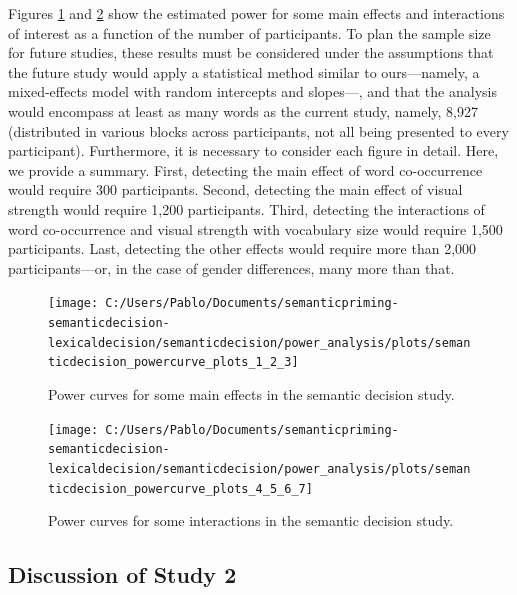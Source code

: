 \documentclass[
  12pt,
  man,floatsintext]{apa7}
\begin{document}
Figures \ref{fig:semanticdecision-powercurve-plots-1-2-3} and \ref{fig:semanticdecision-powercurve-plots-4-5-6-7} show the estimated power for some main effects and interactions of interest as a function of the number of participants. To plan the sample size for future studies, these results must be considered under the assumptions that the future study would apply a statistical method similar to ours---namely, a mixed-effects model with random intercepts and slopes---, and that the analysis would encompass at least as many words as the current study, namely, 8,927 (distributed in various blocks across participants, not all being presented to every participant). Furthermore, it is necessary to consider each figure in detail. Here, we provide a summary. First, detecting the main effect of word co-occurrence would require 300 participants. Second, detecting the main effect of visual strength would require 1,200 participants. Third, detecting the interactions of word co-occurrence and visual strength with vocabulary size would require 1,500 participants. Last, detecting the other effects would require more than 2,000 participants---or, in the case of gender differences, many more than that.

\begin{figure}

{\centering \texttt{[image: C:/Users/Pablo/Documents/semanticpriming-semanticdecision-lexicaldecision/semanticdecision/power\_analysis/plots/semanticdecision\_powercurve\_plots\_1\_2\_3]} 

}

\caption{Power curves for some main effects in the semantic decision study.}\label{fig:semanticdecision-powercurve-plots-1-2-3}
\end{figure}

\begin{figure}

{\centering \texttt{[image: C:/Users/Pablo/Documents/semanticpriming-semanticdecision-lexicaldecision/semanticdecision/power\_analysis/plots/semanticdecision\_powercurve\_plots\_4\_5\_6\_7]} 

}

\caption{Power curves for some interactions in the semantic decision study.}\label{fig:semanticdecision-powercurve-plots-4-5-6-7}
\end{figure}

\hypertarget{discussion-of-study-2}{%
\subsection{Discussion of Study 2}\label{discussion-of-study-2}}
\end{document}
